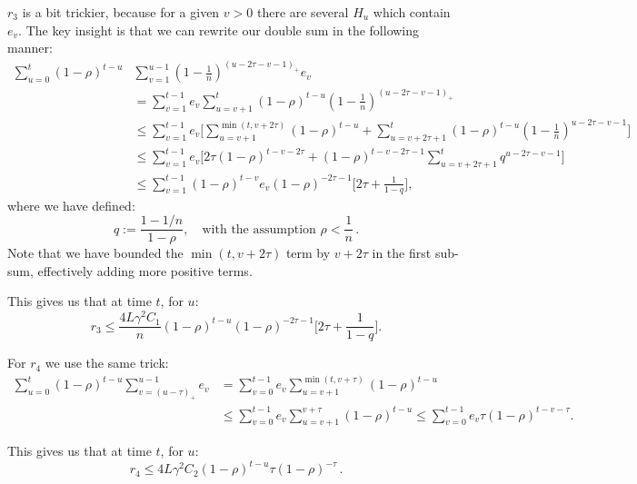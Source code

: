 \documentclass[twoside]{article}
\newcommand{\stepsize}{\gamma}
\newcommand{\overlap}{\tau}
\newcommand{\contraction}{\rho}
\newcommand{\lipschitz}{L}
\begin{document}
$r_3$ is a bit trickier, because for a given $v > 0$ there are several $H_u$ which contain $e_v$. 
The key insight is that we can rewrite our double sum in the following manner:
\begin{align}
\sum_{u=0}^t(1 - \contraction)^{t-u} &\sum_{v=1}^{u-1} (1-\frac{1}{n})^{(u - 2\overlap -v -1)_+} e_v 
\nonumber \\
&= \sum_{v=1}^{t-1} e_v \sum_{u=v+1}^{t}(1 - \contraction)^{t-u}  (1-\frac{1}{n})^{(u - 2\overlap -v -1)_+}
\nonumber \\
&\leq \sum_{v=1}^{t-1} e_v \Big[
		\sum_{u=v+1}^{\min(t, v + 2\overlap)}(1 - \contraction)^{t-u} 
		+ \sum_{u=v + 2 \overlap +1}^{t}(1 - \contraction)^{t-u}  (1-\frac{1}{n})^{u - 2\overlap -v -1}
	\Big]
\nonumber \\
&\leq \sum_{v=1}^{t-1} e_v \Big[
		2\overlap (1 - \contraction)^{t-v-2\overlap}
		+ (1 - \contraction)^{t-v-2\overlap-1} \sum_{u=v + 2 \overlap +1}^{t}q^{u - 2\overlap -v -1}
	\Big]
\nonumber \\
&\leq \sum_{v=1}^{t-1} (1 - \contraction)^{t-v} e_v (1 - \contraction)^{-2\overlap -1} \big[
		2\overlap
		+ \frac{1}{1-q}
	\big],
\end{align}
where we have defined: 
\begin{equation} \label{eq:qDefinition}
q :=\frac{1-1/n}{1-\contraction}, \quad \text{with the assumption $\contraction < \frac{1}{n}$}  \, .
\end{equation}
Note that we have bounded the $\min(t, v+2\overlap)$ term by $v+2\overlap$ in the first sub-sum, effectively adding more positive terms. 

This gives us that at time $t$, for $u$: 
\begin{equation}\label{eq:r3}
r_3 \leq \frac{4\lipschitz\stepsize^2 C_1}{n}(1 - \contraction)^{t-u} (1 - \contraction)^{-2\overlap -1} \big[2\overlap + \frac{1}{1-q}\big] .
\end{equation}

For $r_4$ we use the same trick:
\begin{align}
\sum_{u=0}^t (1-\contraction)^{t-u} \sum_{v=(u-\overlap)_+}^{u-1} e_v
&= \sum_{v=0}^{t-1} e_v  \sum_{u=v+1}^{\min(t, v+\overlap)} (1-\contraction)^{t-u}
\nonumber \\
&\leq \sum_{v=0}^{t-1} e_v  \sum_{u=v+1}^{v+\overlap} (1-\contraction)^{t-u}
\leq \sum_{v=0}^{t-1} e_v \overlap (1-\contraction)^{t-v-\overlap} .
\end{align}

This gives us that at time $t$, for $u$: 
\begin{equation}\label{eq:r4}
r_4 \leq 4\lipschitz\stepsize^2 C_2(1 - \contraction)^{t-u} \overlap (1 - \contraction)^{-\overlap}\,  .
\end{equation}
\end{document}
